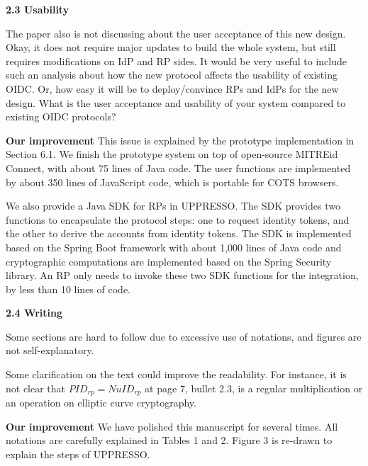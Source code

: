 \documentclass[letterpaper,onecolumn,10pt]{article}
\begin{document}
\vspace{1mm}\noindent\textbf{2.3 Usability}

The paper also is not discussing about the user acceptance of this new design.
Okay, it does not require major updates to build the whole system, but still requires modifications on IdP and RP sides.
It would be very useful to include such an analysis about how the new protocol affects the usability of existing OIDC.
Or, how easy it will be to deploy/convince RPs and IdPs for the new design.
What is the user acceptance and usability of your system compared to existing OIDC protocols?


\vspace{1mm}\noindent\textbf{Our improvement}
This issue is explained by the prototype implementation in Section 6.1.
We finish the prototype system on top of open-source MITREid Connect,
    with about 75 lines of Java code.
The user functions are implemented by about 350 lines of JavaScript code,
    which is portable for COTS browsers.

We also provide a Java SDK for RPs in UPPRESSO.
The SDK provides two functions to encapsulate the protocol steps:
one to request identity tokens, and the other to derive the accounts from identity tokens.
 The SDK is implemented based on the Spring Boot framework with about 1,000 lines of Java code
  and cryptographic computations are implemented based on the Spring Security library.
An RP only needs to invoke these two SDK functions for the integration,  by less than 10 lines of code.


\vspace{1mm}\noindent\textbf{2.4 Writing}

Some sections are hard to follow due to excessive use of notations, and figures are not self-explanatory.

Some clarification on the text could improve the readability. For instance, it is not clear that $PID_{rp}= NuID_{rp}$ at page 7, bullet 2.3, is a regular multiplication or an operation on elliptic curve cryptography.

\vspace{1mm}\noindent\textbf{Our improvement}
We have polished this manuscript for several times.
All notations are carefully explained in Tables 1 and 2.
Figure 3 is re-drawn to explain the steps of UPPRESSO.



%
%
\end{document}
